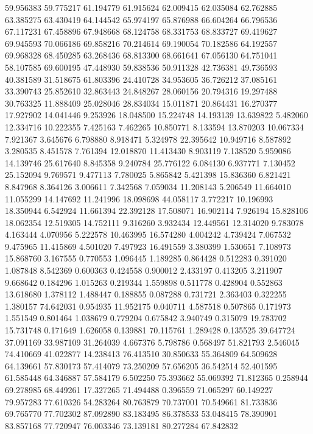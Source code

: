 59.956383
59.775217
61.194779
61.915624
62.009415
62.035084
62.762885
63.385275
63.430419
64.144542
65.974197
65.876988
66.604264
66.796536
67.117231
67.458896
67.948668
68.124758
68.331753
68.833727
69.419627
69.945593
70.066186
69.858216
70.214614
69.190054
70.182586
64.192557
69.968328
68.450285
63.268436
68.813300
68.661641
67.056130
64.751041
58.107585
69.600195
47.448930
59.838536
50.911328
42.736381
49.736593
40.381589
31.518675
61.803396
24.410728
34.953605
36.726212
37.085161
33.390743
25.852610
32.863443
24.848267
28.060156
20.794316
19.297488
30.763325
11.888409
25.028046
28.834034
15.011871
20.864431
16.270377
17.927902
14.041446
9.253926
18.048500
15.224748
14.193139
13.639822
5.482060
12.334716
10.222355
7.425163
7.462265
10.850771
8.133594
13.870203
10.067334
7.921367
3.645676
6.798880
8.918471
5.324978
22.395642
10.949716
8.587892
3.280535
8.451578
7.761394
12.018870
11.413430
8.903119
7.138520
5.959086
14.139746
25.617640
8.845358
9.240784
25.776122
6.084130
6.937771
7.130452
25.152094
9.769571
9.477113
7.780025
5.865842
5.421398
15.836360
6.821421
8.847968
8.364126
3.006611
7.342568
7.059034
11.208143
5.206549
11.664010
11.055299
14.147692
11.241996
18.098698
44.058117
3.772217
10.196993
18.350944
6.542924
11.661394
22.392128
17.508071
16.902114
7.926194
15.828106
18.062354
12.519305
14.752111
9.316260
3.932434
12.449561
12.314020
9.783078
4.163444
4.070956
5.222578
10.463995
16.574280
4.004242
4.739424
7.067532
9.475965
11.415869
4.501020
7.497923
16.491559
3.380399
1.530651
7.108973
15.868760
3.167555
0.770553
1.096445
1.189285
0.864428
0.512283
0.391020
1.087848
8.542369
0.600363
0.424558
0.900012
2.433197
0.413205
3.211907
9.668642
0.184296
1.015263
0.219344
1.559898
0.511778
0.428904
0.552863
13.618680
1.378112
1.488447
0.188855
0.087288
0.731721
2.363403
0.322255
1.380157
74.642031
0.954935
11.952175
0.040711
4.587518
0.507865
0.171973
1.551549
0.801464
1.038679
0.779204
0.675842
3.940749
0.315079
19.783702
15.731748
0.171649
1.626058
0.139881
70.115761
1.289428
0.135525
39.647724
37.091169
33.987109
31.264039
4.667376
5.798786
0.568497
51.821793
2.546045
74.410669
41.022877
14.238413
76.413510
30.850633
55.364809
64.509628
64.139661
57.830173
57.414079
73.250209
57.656205
36.542514
52.401595
61.585448
64.346887
57.584179
6.502250
75.393662
55.069392
71.812365
0.258944
69.278985
68.449261
17.327265
71.494488
0.396559
71.065297
60.149227
79.957283
77.610326
54.283264
80.763879
70.737001
70.549661
81.733836
69.765770
77.702302
87.092890
83.183495
86.378533
53.048415
78.390901
83.857168
77.720947
76.003346
73.139181
80.277284
67.842832
